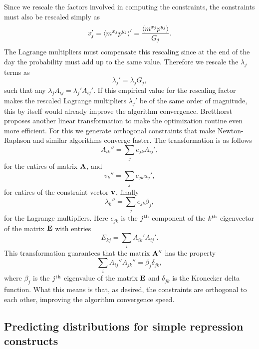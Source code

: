 Since we rescale the factors involved in computing the constraints, the
constraints must also be rescaled simply as
\begin{equation}
v_j' = \left\langle m^{x_j} p^{y_j} \right\rangle' = {\left\langle m^{x_j} p^{y_j} \right\rangle \over G_j}.
\end{equation}
The Lagrange multipliers must compensate this rescaling since at the end of the
day the probability must add up to the same value. Therefore we rescale the
$\lambda_j$ terms as
\begin{equation}
\lambda_j' = \lambda_j G_j,
\end{equation}
such that any $\lambda_j A_{ij} = \lambda_j' A_{ij}'$. If this empirical value
for the rescaling factor makes the rescaled Lagrange multipliers $\lambda_j'$ be
of the same order of magnitude, this by itself would already improve the
algorithm convergence. Bretthorst proposes another linear transformation to make
the optimization routine even more efficient. For this we generate orthogonal
constraints that make Newton-Raphson and similar algorithms converge faster. The
transformation is as follows
\begin{equation}
  A_{ik}'' = \sum_j {e}_{jk} A_{ij}',
\end{equation}
for the entires of matrix $\mathbf{A}$, and
\begin{equation}
  v_k'' = \sum_j {e}_{jk} u_j',
\end{equation}
for entires of the constraint vector $\mathbf{v}$, finally
\begin{equation}
  \lambda_k'' = \sum_j {e}_{jk} \beta_j,
\end{equation}
for the Lagrange multipliers. Here ${e}_{jk}$ is the $j^\text{th}$ component
of the $k^\text{th}$ eigenvector of the matrix $\mathbf{E}$ with entries
\begin{equation}
  {E}_{kj} = \sum_i {A}_{ik}' {A}_{ij}'.
\end{equation}
This transformation guarantees that the matrix $\mathbf{A}''$ has the property
\begin{equation}
  \sum_i A_{ij}'' A_{jk}'' = \beta_j \delta_{jk},
\end{equation}
where $\beta_j$ is the $j^\text{th}$ eigenvalue of the matrix $\mathbf{E}$ and
$\delta_{jk}$ is the Kronecker delta function. What this means is that, as
desired, the constraints are orthogonal to each other, improving the algorithm
convergence speed.

\subsection{Predicting distributions for simple repression constructs}

